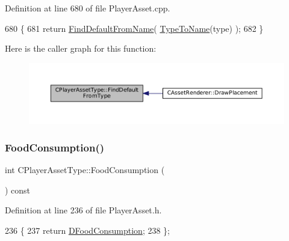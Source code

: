 Definition at line 680 of file Player\+Asset.\+cpp.


\begin{DoxyCode}
680                                                                                       \{
681     \textcolor{keywordflow}{return} \hyperlink{classCPlayerAssetType_a7e1684eac4efaf7afe9a5c15af262b33}{FindDefaultFromName}( \hyperlink{classCPlayerAssetType_a66ce89c35b74940e9fc947a1f4b9e770}{TypeToName}(type) );
682 \}
\end{DoxyCode}
Here is the caller graph for this function\+:
\nopagebreak
\begin{figure}[H]
\begin{center}
\leavevmode
\includegraphics[width=350pt]{classCPlayerAssetType_a7b3c6682f379bfcd974342329eaabab9_icgraph}
\end{center}
\end{figure}
\hypertarget{classCPlayerAssetType_aa42527737b1518ce4d5aa8533bd9bb30}{}\label{classCPlayerAssetType_aa42527737b1518ce4d5aa8533bd9bb30} 
\subsubsection{\texorpdfstring{Food\+Consumption()}{FoodConsumption()}}
{\footnotesize\ttfamily int C\+Player\+Asset\+Type\+::\+Food\+Consumption (\begin{DoxyParamCaption}{ }\end{DoxyParamCaption}) const\hspace{0.3cm}{\ttfamily [inline]}}



Definition at line 236 of file Player\+Asset.\+h.


\begin{DoxyCode}
236                                    \{
237             \textcolor{keywordflow}{return} \hyperlink{classCPlayerAssetType_a8fcab35c2b576476b6f2c80c8b8762fb}{DFoodConsumption};  
238         \};
\end{DoxyCode}
\hypertarget{classCPlayerAssetType_ad8458f72d16825d3c677a75967cf6227}{}\label{classCPlayerAssetType_ad8458f72d16825d3c677a75967cf6227} 
